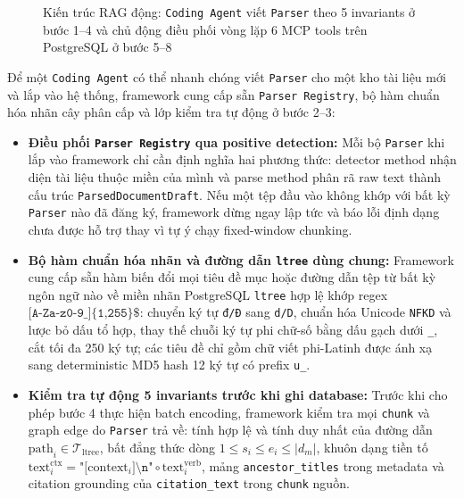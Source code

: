 \begin{figure}[H]
\caption{Kiến trúc RAG động: \texttt{Coding Agent} viết \texttt{Parser} theo 5 invariants ở bước 1--4 và chủ động điều phối vòng lặp 6 MCP tools trên PostgreSQL ở bước 5--8}
\label{fig:workflow}
\end{figure}

Để một \texttt{Coding Agent} có thể nhanh chóng viết \texttt{Parser} cho một kho tài liệu mới và lắp vào hệ thống, framework cung cấp sẵn \texttt{Parser Registry}, bộ hàm chuẩn hóa nhãn cây phân cấp và lớp kiểm tra tự động ở bước 2--3:
\begin{itemize}
    \item \textbf{Điều phối \texttt{Parser Registry} qua positive detection:} Mỗi bộ \texttt{Parser} khi lắp vào framework chỉ cần định nghĩa hai phương thức: detector method nhận diện tài liệu thuộc miền của mình và parse method phân rã raw text thành cấu trúc \texttt{ParsedDocumentDraft}. Nếu một tệp đầu vào không khớp với bất kỳ \texttt{Parser} nào đã đăng ký, framework dừng ngay lập tức và báo lỗi định dạng chưa được hỗ trợ thay vì tự ý chạy fixed-window chunking.
    \item \textbf{Bộ hàm chuẩn hóa nhãn và đường dẫn \texttt{ltree} dùng chung:} Framework cung cấp sẵn hàm biến đổi mọi tiêu đề mục hoặc đường dẫn tệp từ bất kỳ ngôn ngữ nào về miền nhãn PostgreSQL \texttt{ltree} hợp lệ khớp regex $\texttt{\^{}[A-Za-z0-9\_]\{1,255\}\$}$: chuyển ký tự \texttt{đ/Đ} sang \texttt{d/D}, chuẩn hóa Unicode \texttt{NFKD} và lược bỏ dấu tổ hợp, thay thế chuỗi ký tự phi chữ-số bằng dấu gạch dưới \texttt{\_}, cắt tối đa 250 ký tự; các tiêu đề chỉ gồm chữ viết phi-Latinh được ánh xạ sang deterministic MD5 hash 12 ký tự có prefix \texttt{u\_}.
    \item \textbf{Kiểm tra tự động 5 invariants trước khi ghi database:} Trước khi cho phép bước 4 thực hiện batch encoding, framework kiểm tra mọi \texttt{chunk} và graph edge do \texttt{Parser} trả về: tính hợp lệ và tính duy nhất của đường dẫn $\text{path}_i \in \mathcal{T}_{\text{ltree}}$, bất đẳng thức dòng $1 \le s_i \le e_i \le |d_m|$, khuôn dạng tiền tố $\text{text}^{\text{ctx}}_i = \texttt{"[}\text{context}_i\texttt{]\textbackslash n"} \circ \text{text}^{\text{verb}}_i$, mảng \texttt{ancestor\_titles} trong metadata và citation grounding của \texttt{citation\_text} trong \texttt{chunk} nguồn.
\end{itemize}

